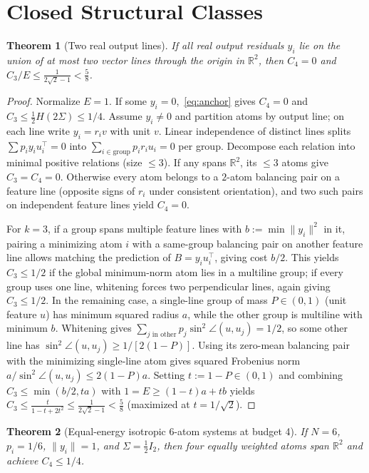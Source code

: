 \documentclass[11pt]{article}
\theoremstyle{plain}
\newtheorem{theorem}{Theorem}
\theoremstyle{definition}
\theoremstyle{remark}
\begin{document}
\section{Closed Structural Classes}

\begin{theorem}[Two real output lines]\label{thm:twolines}
If all real output residuals $y_i$ lie on the union of at most two vector lines through the origin in $\mathbb{R}^2$, then $C_4 = 0$ and $C_3/E \le \frac{1}{2\sqrt{2}-1} < \frac{5}{8}$.
\end{theorem}

\begin{proof}
Normalize $E = 1$. If some $y_i = 0$,~\eqref{eq:anchor} gives $C_4 = 0$ and $C_3 \le \frac{1}{2}H(2\Sigma) \le 1/4$.
Assume $y_i \neq 0$ and partition atoms by output line; on each line write $y_i = r_i v$ with unit $v$.
Linear independence of distinct lines splits $\sum p_i y_i u_i^\top = 0$ into $\sum_{i \in \text{group}} p_i r_i u_i = 0$ per group.
Decompose each relation into minimal positive relations (size $\le 3$).
If any spans $\mathbb{R}^2$, its $\le 3$ atoms give $C_3 = C_4 = 0$.
Otherwise every atom belongs to a $2$-atom balancing pair on a feature line (opposite signs of $r_i$ under consistent orientation), and two such pairs on independent feature lines yield $C_4 = 0$.

For $k = 3$, if a group spans multiple feature lines with $b := \min \|y_i\|^2$ in it, pairing a minimizing atom $i$ with a same-group balancing pair on another feature line allows matching the prediction of $B = y_i u_i^\top$, giving cost $b/2$.
This yields $C_3 \le 1/2$ if the global minimum-norm atom lies in a multiline group; if every group uses one line, whitening forces two perpendicular lines, again giving $C_3 \le 1/2$.
In the remaining case, a single-line group of mass $P \in (0,1)$ (unit feature $u$) has minimum squared radius $a$, while the other group is multiline with minimum $b$.
Whitening gives $\sum_{j \text{ in other}} p_j \sin^2\angle(u, u_j) = 1/2$, so some other line has $\sin^2\angle(u, u_j) \ge 1/[2(1-P)]$.
Using its zero-mean balancing pair with the minimizing single-line atom gives squared Frobenius norm $a/\sin^2\angle(u, u_j) \le 2(1-P)a$.
Setting $t := 1-P \in (0,1)$ and combining $C_3 \le \min(b/2, ta)$ with $1 = E \ge (1-t)a + tb$ yields $C_3 \le \frac{t}{1 - t + 2t^2} \le \frac{1}{2\sqrt{2}-1} < \frac{5}{8}$ (maximized at $t = 1/\sqrt{2}$).
\end{proof}

\begin{theorem}[Equal-energy isotropic 6-atom systems at budget 4]\label{thm:6atom}
If $N = 6$, $p_i = 1/6$, $\|y_i\| = 1$, and $\Sigma = \frac{1}{2}I_2$, then four equally weighted atoms span $\mathbb{R}^2$ and achieve $C_4 \le 1/4$.
\end{theorem}
\end{document}
